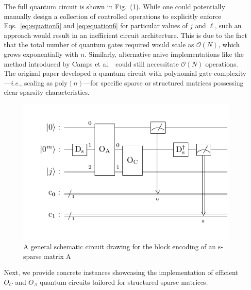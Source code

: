 \documentclass{article}
\begin{document}
    The full quantum circuit is shown in Fig.~(\ref{fig:circuit2}).
    While one could potentially manually design a collection of controlled operations to explicitly enforce Eqs.~\eqref{eq:equation5} and \eqref{eq:equation6} for particular values of $j$ and $\ell$, such an approach would result in an inefficient circuit architecture.
    This is due to the fact that the total number of quantum gates required would scale as $\mathcal{O}(N)$, which grows exponentially with $n$.
    Similarly, alternative naive implementations like the method introduced by Camps et al.~\cite{camps2022fable} could still necessitate $\mathcal{O}(N)$ operations.
    The original paper developed a quantum circuit with polynomial gate complexity---\emph{i.e.}, scaling as $\text{poly}(n)$---for specific sparse or structured matrices possessing clear sparsity characteristics.
    \begin{figure}[htbp]
        \centering
        \includegraphics{pdf/main_circuit}
        \caption{
            A general schematic circuit drawing for the block encoding of an s-sparse matrix A
        }
        \label{fig:circuit2}
    \end{figure}


    Next, we provide concrete instances showcasing the implementation of efficient $O_C$ and $O_A$ quantum circuits tailored for structured sparse matrices.



    
    
\end{document}

